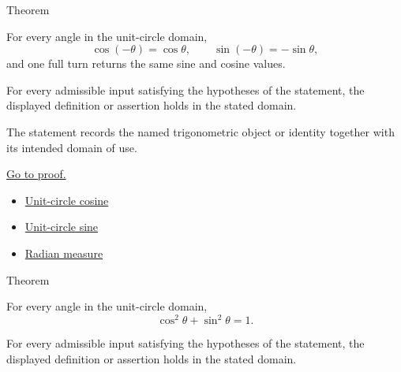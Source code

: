 

\begin{theorembox}{Theorem}
\begin{theorem}
\label{thm:trig-symmetry-periodicity}
For every angle in the unit-circle domain,
\[
\cos(-\theta)=\cos\theta,\qquad \sin(-\theta)=-\sin\theta,
\]
and one full turn returns the same sine and cosine values.
\end{theorem}
\end{theorembox}
\begin{remark*}
For every admissible input satisfying the hypotheses of the statement, the
displayed definition or assertion holds in the stated domain.
\end{remark*}

\begin{remark*}[Interpretation]
The statement records the named trigonometric object or identity together with
its intended domain of use.
\end{remark*}

\begin{remark*}[Proof]
\hyperref[prf:trig-symmetry-periodicity]{Go to proof.}
\end{remark*}
\begin{dependencies}
\begin{itemize}
  \item \hyperref[def:unit-circle-cosine]{Unit-circle cosine}
  \item \hyperref[def:unit-circle-sine]{Unit-circle sine}
  \item \hyperref[def:radian-measure]{Radian measure}
\end{itemize}
\end{dependencies}



\begin{theorembox}{Theorem}
\begin{theorem}
\label{thm:pythagorean-trig-identity}
For every angle in the unit-circle domain,
\[
  \cos^2\theta+\sin^2\theta=1.
\]
\end{theorem}
\end{theorembox}
\begin{remark*}
For every admissible input satisfying the hypotheses of the statement, the
displayed definition or assertion holds in the stated domain.
\end{remark*}

